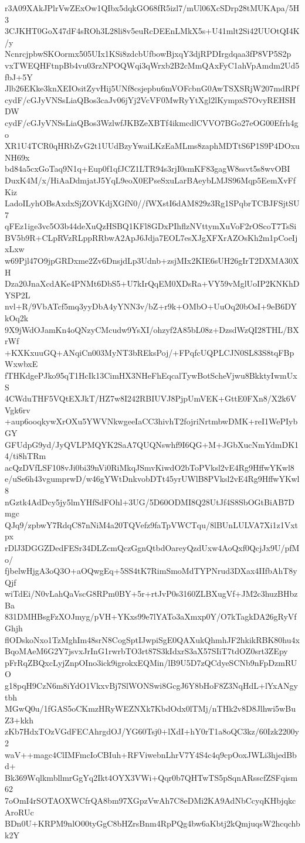r3A09XAkJPlrVwZExOw1QIbx5dqkGO68fR5izl7/mUl06XcSDrp28tMUKApa/5H3
3CJKHT0GoX47dF4sROh3L28li8v5euRcDEEnLMkX5s+U41mlt2Si42UUOtQI4K/y
NcnrcjpbwSKOormx505UIx1KSi8zdcbUfbowBjxqY3djRPDIrgdqaa3fP8VP5S2p
vxTWEQHFtnpBb4vu03rzNPOQWqi3qWrxb2B2cMmQAxFyC1ahVpAmdm2Ud5fbJ+5Y
Jlb26EKke3knXEIOsitZyvHij5UNf8csjepbu6mVOFcbnG0AwTSXSRjW207mdRPf
cydF/cGJyVNSsLiaQBos3caJv06jYj2VcVF0MwRyYtXgl2lKympxS7OvyREHSHDW
cydF/cGJyVNSsLiaQBos3WzlwfJKBZeXBTf4ikmcdlCVVO7BGo27eOG00Efrh4go
XR1U4TCR0qHRbZvG2t1UUdBzyYwaiLKzEaMLms8zaphMDTtS6P1S9P4DOxuNH69x
bd84a5cxGoTaq9N1q+Eup0f1qfJCZ1LTR94s3rjI0smKF83gagW8ssvt5s8wvOBI
DuxK4M/x/HiAaDdmjatJ5YqL9eoX0EPseSxuLarBAeybLMJS96Mqp5EemXvFfKiz
LadoILyhOBsAxdxSjZOVKdjXGfN0//fWXstI6dAM829z3Rg1SPqbrTCBJFSjtSU7
qFEz1ige3vc5O3b44deXuQzHSBQ1KFl8GDxPIhflzNVttymXuVoF2rOScoT7TsSi
BV5b9R+CLpRVzRLppRRbwA2ApJ6Jdja7EOL7esXJgXFXrAZOsKh2m1pCoeIjxLxw
w69Pjl47O9jpGRDxme2Zv6DnsjdLp3Udnb+zsjMIx2KIE6sUH26gIrT2DXMA30XH
Dza20JnaXcdAKe4PNMt6DbS5+U7kIrQqEM0XDsRa+VY59vMglUoIP2KNKhDYSP2L
nvl+R/9VbATcf5mq3yyDbA4yYNN3v/bZ+r9k+OMbO+UuOq20bOsI+9eB6DYkOq2k
9X9jWdOJamKn4oQNzyCMcudw9YsXI/ohzyf2A85bL08z+DzsdWzQI28THL/BXrWf
+KXKxuuGQ+ANqiCn003MyNT3bREksPoj/+FPqfcUQPLCJN0SL83S8tqFBpWxwbxE
fTHKdgePJko95qT1HcIk13CimHX3NHeFhEqcalTywBotScheVjwu8BkktyIwmUxS
4CWduTHF5VQtEXJkT/HZ7w8I242RBIUVJ8PjpUmVEK+GttE0FXn8/X2k6VVgk6rv
+aup6ooqkywXrOXu5YWVNkwgeeIaCC3hivhT2fojriNrtmbwDMK+reI1WePIybGY
GFUdpG9yd/JyQVLPMQYK2SaA7QUQNswhf9I6QG+M+JGbXucNmYdmDK14/ti8hTRm
acQzDVfLSF108vJi0bi39nVi0RiMkqJSmvKiwdO2bToPVksl2vE4Rg9HffwYKwl8
e/uSe6h43vgumprwD/w46gYWtDnkvobDTt45yrUWlB8PVksl2vE4Rg9HffwYKwl8
nGztk4AdDcy5jy5lmYHfSdFOhl+3UG/5D60ODMI8Q28UtJf4S8SbOGtBiAB7Dmgc
QJq9/zpbwY7RdqC87nNiM4a20TQVefz9faTpVWCTqu/8lBUnLULVA7Xi1z1Vxtpx
rDlJ3DGGZDedFESr34DLZcmQczGgnQtbdOareyQzdUxw4AoQxf0QcjJx9U/pfMo/
fjbelwHjgA3oQ3O+aOQwgEq+5SS4tK7RimSmoMdTYPNrud3DXax4IIfbAhT8yQjf
wiTdEi/N0vLahQaVscG8RPm0BY+5r+rtJvP0s3160ZLBXugVf+JM2c3huzBHbzBa
831DMHBsgFzXOJmyg/pVH+YKxs99e7lYATo3aXmxp0Y/O7kTagkDA26gRyVfGhjh
flODskoNxo1TzMghIm48srN8CogSptIJwpiSgE0QAXukQhmhJF2hkikRBK80hu4x
BqoMAeM6G2Y7jsvxJrInG1rwrbTO3rt87S3kIdxrS3aX57SIiT7tdOZ0srt3ZEpy
pFrRqZBQxcLyjZnpOIno3ick9igrokxEQMin/lB9U5D7zQCdyeSCNb9nFpDzmRUO
g18pqH9CzN6m8iYdO1VkxvBj7SlWONSwi8GcgJ6Y8bHoF8Z3NqHdL+lYxANgytbh
MGwQ0u/1fGAS5oCKmzHRyWEZNXk7KbdOdx0lTMj/nTHk2v8D8Jlhwi5wBuZ3+kkh
zKb7HdxTOzVGdFECAhrgdOJ/YG60Tsj0+lXdI+hY0rT1a8oQC3kz/60Izk2200y2
waV++magc4ClIMFmcIoCBIuh+RFViwebnLhrV7Y4S4c4q9cpOoxJWLi3hjedBbd+
Bk369WqlkmbllmrGgYq2Ikt4OYX3VWi+Qqr0b7QHTwTS5pSqnARsscfZSFqism62
7oOmI4rSOTAOXWCfrQA8bm97XGpzVwAh7C8eDMi2KA9AdNbCcyqKHbjqkcAroRUc
BDn0U+KRPM9nlO00tyGgC8bHZrsBnm4RpPQg4bw6aKbtj2kQmjuqsW2hcqchbk2Y
